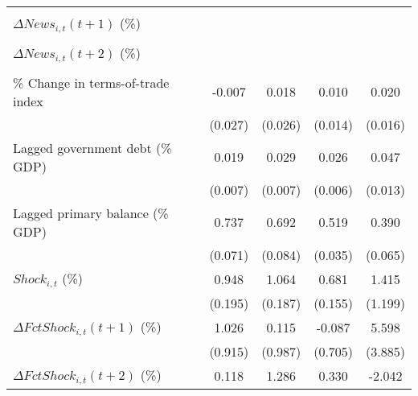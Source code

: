 {\begin{tabular}{l*{4}{c}}
                    &                     &                     &                     &                     \\
\addlinespace
$ \Delta News_{i,t}(t+1)$ (\%)&                     &                     &                     &                     \\
                    &                     &                     &                     &                     \\
\addlinespace
$ \Delta News_{i,t}(t+2)$ (\%)&                     &                     &                     &                     \\
                    &                     &                     &                     &                     \\
\addlinespace
\% Change in terms-of-trade index&      -0.007         &       0.018         &       0.010         &       0.020         \\
                    &     (0.027)         &     (0.026)         &     (0.014)         &     (0.016)         \\
\addlinespace
Lagged government debt (\% GDP)&       0.019\sym{**} &       0.029\sym{***}&       0.026\sym{***}&       0.047\sym{***}\\
                    &     (0.007)         &     (0.007)         &     (0.006)         &     (0.013)         \\
\addlinespace
Lagged primary balance (\% GDP)&       0.737\sym{***}&       0.692\sym{***}&       0.519\sym{***}&       0.390\sym{***}\\
                    &     (0.071)         &     (0.084)         &     (0.035)         &     (0.065)         \\
\addlinespace
$ Shock_{i,t}$ (\%) &       0.948\sym{***}&       1.064\sym{***}&       0.681\sym{***}&       1.415         \\
                    &     (0.195)         &     (0.187)         &     (0.155)         &     (1.199)         \\
\addlinespace
$ \Delta FctShock_{i,t}(t+1)$ (\%)&       1.026         &       0.115         &      -0.087         &       5.598         \\
                    &     (0.915)         &     (0.987)         &     (0.705)         &     (3.885)         \\
\addlinespace
$ \Delta FctShock_{i,t}(t+2)$ (\%)&       0.118         &       1.286         &       0.330         &      -2.042         \\

\end{tabular}}
